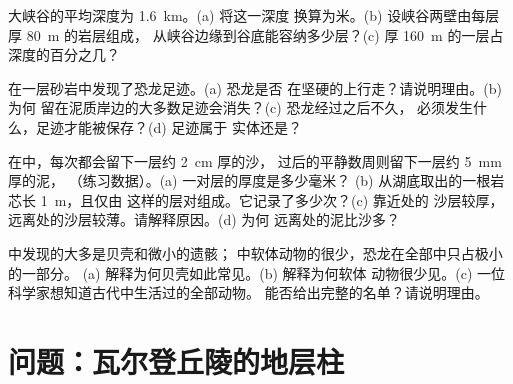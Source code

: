 \begin{exercise}[$\star\star$]\label{exo:g7:sediments-and-fossils:9}
大峡谷的平均深度为 \qty{1.6}{km}。(a) 将这一深度
换算为米。(b) 设峡谷两壁由每层厚 \qty{80}{m} 的岩层组成，
从峡谷边缘到谷底能容纳多少层？(c) 厚 \qty{160}{m}
的一层占深度的百分之几？
\end{exercise}

\begin{exercise}[$\star\star$]\label{exo:g7:sediments-and-fossils:10}
在一层砂岩中发现了恐龙足迹。(a) 恐龙是否
在坚硬的上行走？请说明理由。(b) 为何
留在泥质岸边的大多数足迹会消失？(c) 恐龙经过之后不久，
必须发生什么，足迹才能被保存？(d) 足迹属于
实体还是？
\end{exercise}

\begin{exercise}[$\star\star\star$]\label{exo:g7:sediments-and-fossils:11}
在中，每次都会留下一层约 \qty{2}{cm} 厚的沙，
过后的平静数周则留下一层约 \qty{5}{mm} 厚的泥，
（练习数据）。(a) 一对层的厚度是多少毫米？
(b) 从湖底取出的一根岩芯长 \qty{1}{m}，且仅由
这样的层对组成。它记录了多少次？(c) 靠近处的
沙层较厚，远离处的沙层较薄。请解释原因。(d) 为何
远离处的泥比沙多？
\end{exercise}

\begin{exercise}[$\star\star\star$]\label{exo:g7:sediments-and-fossils:12}
中发现的大多是贝壳和微小的遗骸；
中软体动物的很少，恐龙在全部中只占极小的一部分。
(a) 解释为何贝壳如此常见。(b) 解释为何软体
动物很少见。(c) 一位科学家想知道古代中生活过的全部动物。
能否给出完整的名单？请说明理由。
\end{exercise}

\section{问题：瓦尔登丘陵的地层柱}

